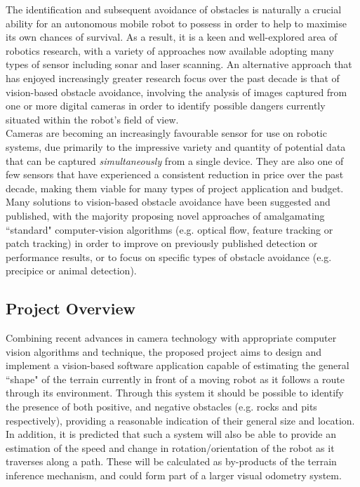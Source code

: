 \documentclass[10pt,fleqn,twoside]{article}
\begin{document}
The identification and subsequent avoidance of obstacles is naturally a crucial ability for an autonomous mobile robot to possess in order to help to maximise its own chances of survival. As a result, it is a keen and well-explored area of robotics research, with a variety of approaches now available adopting many types of sensor including sonar and laser scanning. An alternative approach that has enjoyed increasingly greater research focus over the past decade is that of vision-based obstacle avoidance, involving the analysis of images captured from one or more digital cameras in order to identify possible dangers currently situated within the robot's field of view. \\

Cameras are becoming an increasingly favourable sensor for use on robotic systems, due primarily to the impressive variety and quantity of potential data that can be captured \textit{simultaneously} from a single device. They are also one of few sensors that have experienced a consistent reduction in price over the past decade, making them viable for many types of project application and budget. \\

Many solutions to vision-based obstacle avoidance have been suggested and published, with the majority proposing novel approaches of amalgamating ``standard" computer-vision algorithms (e.g. optical flow, feature tracking or patch tracking) in order to improve on previously published detection or performance results, or to focus on specific types of obstacle avoidance (e.g. precipice or animal detection).

\subsection{Project Overview}

Combining recent advances in camera technology with appropriate computer vision algorithms and technique, the proposed project aims to design and implement a vision-based software application capable of estimating the general ``shape" of the terrain currently in front of a moving robot as it follows a route through its environment. Through this system it should be possible to identify the presence of both positive, and negative obstacles (e.g. rocks and pits respectively), providing a reasonable indication of their general size and location. \\

In addition, it is predicted that such a system will also be able to provide an estimation of the speed and change in rotation/orientation of the robot as it traverses along a path. These will be calculated as by-products of the terrain inference mechanism, and could form part of a larger visual odometry system. \\
\end{document}
